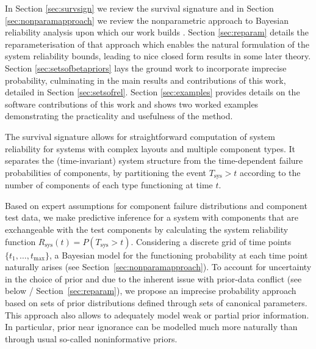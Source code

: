 \documentclass[12pt, a4paper]{elsarticle}
\newcommand{\Rsys}{R_\text{sys}}
\def\Tsys{T_\text{sys}}
\def\tmax{t_\text{max}}
\newcommand{\td}[1]{%
  \iftoggle{td}{%
    \todo[inline]{#1}%
  }{}%
}
\begin{document}
In Section \ref{sec:survsign} we review the survival 
signature and in Section \ref{sec:nonparamapproach} we 
review the nonparametric approach to Bayesian reliability analysis
upon which our work builds 
\cite{2015:bayessurvsign}.  Section \ref{sec:reparam} details
the reparameterisation of that approach which enables the natural
formulation of the system reliability bounds, leading to
nice closed form results in some later theory.
Section \ref{sec:setsofbetapriors} lays the ground work to incorporate imprecise probability,
culminating in the main results and contributions of this 
work, detailed in Section \ref{sec:setsofrel}.  Section 
\ref{sec:examples} provides details on the software contributions
of this work and shows two worked examples
demonstrating the practicality and usefulness of the method.


\iffalse
\td{*** LOUIS: Not sure if the above is too compact or ok and whether we need to be more expansive in the orange bit above?  Thoughts appreciated! I've left text below which you may want to draw from? ***}

The survival signature allows for straightforward computation of system reliability
for systems with complex layouts and multiple component types.
It separates the (time-invariant) system structure from the time-dependent failure probabilities of components,
by partitioning the event $\Tsys > t$ according to the number of components of each type functioning at time $t$.

Based on expert assumptions for component failure distributions and component test data,
we make predictive inference for a system with components that are exchangeable
with the test components by calculating the system reliability function $\Rsys(t) = P(\Tsys > t)$.
Considering a discrete grid of time points $\{t_1, \ldots, \tmax\}$,
a Bayesian model for the functioning probability at each time point naturally arises (see Section~\ref{sec:nonparamapproach}).
To account for uncertainty in the choice of prior
and due to the inherent issue with prior-data conflict (see below / Section~\ref{sec:reparam}),
we propose an imprecise probability approach
based on sets of prior distributions defined through sets of canonical parameters.
This approach also allows to adequately model weak or partial prior information.
In particular, prior near ignorance can be modelled much more naturally than through usual so-called noninformative priors. 
\end{document}
